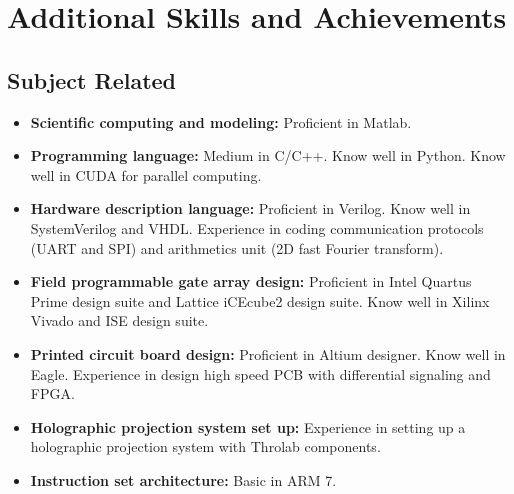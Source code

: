 \documentclass[11pt,a4paper,roman]{moderncv}        %
\begin{document}
\section{Additional Skills and Achievements}
\subsection{Subject Related}
\begin{itemize}
	\item \textbf{Scientific computing and modeling:} Proficient in Matlab.
	\item \textbf{Programming language:} Medium in C/C++. Know well in Python. Know well in CUDA for parallel computing.
	\item \textbf{Hardware description language:} Proficient in Verilog. Know well in SystemVerilog and VHDL. Experience in coding communication protocols (UART and SPI) and arithmetics unit (2D fast Fourier transform).
	\item \textbf{Field programmable gate array design:} Proficient in Intel Quartus Prime design suite and Lattice iCEcube2 design suite. Know well in Xilinx Vivado and ISE design suite.
	\item \textbf{Printed circuit board design:} Proficient in Altium designer. Know well in Eagle. Experience in design high speed PCB with differential signaling and FPGA.
	\item \textbf{Holographic projection system set up:} Experience in setting up a holographic projection system with Throlab components.
	\item \textbf{Instruction set architecture:} Basic in ARM 7.
\end{itemize}
\end{document}
